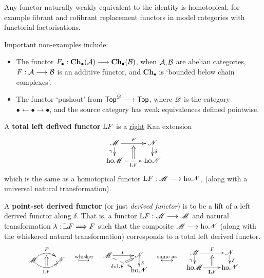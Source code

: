 \documentclass[11pt]{article}
\begin{document}
\begin{3. Derived functors via deformations}
\begin{itemise}
\item Any functor naturally weakly equivalent to the identity is homotopical, for example fibrant and cofibrant replacement functors in model categories with functorial factorisations.
\item Important non-examples include:\begin{itemize}\squishlist
\setlength{\parindent}{.25in}
\item The functor $F_\bullet:\textbf{Ch}_\bullet(\mathcal{A})\longrightarrow \textbf{Ch}_\bullet(\mathcal{B})$, when $\mathcal{A},\mathcal{B}$ are abelian categories, $F:\mathcal{A}\longrightarrow\mathcal{B}$ is an additive functor, and $\textbf{Ch}_\bullet$ is `bounded below chain complexes'.
\item The functor `pushout' from $\mathsf{Top}^{\mathscr{D}}\longrightarrow\mathsf{Top}$, where $\mathscr{D}$ is the category $\bullet \leftarrow\bullet \rightarrow\bullet$, and the source category has weak equivalences defined pointwise.
\end{itemize}
\item A \textbf{total left defived functor} $\textup{L}F$ is a \underline{right} Kan extension
\[\xymatrix@R=4mm{
\scrM
\ar[r]^-{F}_{}="t"
\ar[d]_-{\gamma}
&%
\scrN
\ar[d]^-{\delta}
\\%
\ho\scrM
\ar@{-->}[r]_-{\textup{L}F}^{}="b"
&%
\ho\scrN%
\ar@{=>}"b";"t"
}\]
which is the same as a homotopical functor $\textup{L}F:\mathscr{M}\longrightarrow\textup{ho}\mathscr{N}$, (along with a universal natural transformation).
\item A \textbf{point-set derived functor} (or just \emph{derived functor}) is to be a lift of a left derived functor along $\delta$. That is, a functor $\mathbb{L}F:\mathscr{M}\longrightarrow\mathscr{M}$ and natural transformation $\lambda:\mathbb{L}F\Longrightarrow F$ such that the composite $\mathscr{M}\longrightarrow\textup{ho}\mathscr{N}$ (along with the whiskered natural transformation) corresponds to a total left derived functor.
\[
\vcenter{\xymatrix@1{
\scrM
\ar@/^1em/[r]^-{F}_{}="1"
\ar@/_1em/[r]_-{\mathbb{L}F}^{}="2"
&%
\scrN
\ar@{=>}"2";"1"
}}
\quad \overset{\textup{whisker}}{\mapsto}\quad 
\vcenter{\xymatrix@1@R=4mm{
\scrM
\ar[r]^-{F}_{}="t"
\ar@{-->}[dr]_-{\delta\circ\mathbb{L}F}^{}="b"
&%
\scrN
\ar[d]^\delta
\\%
&%
\ho\scrN%
\ar@{=>}"b";[u]
}}
\quad \overset{\textup{same as}}{\longleftrightarrow}\quad 
\vcenter{\xymatrix@1@R=4mm{
\scrM
\ar[r]^-{F}_{}="t"
\ar[d]_\gamma
&%
\scrN
\ar[d]^\delta
\\%
\ho\scrM
\ar@{->}[r]_-{\textbf{L}F}^{}="b"
&%
\ho\scrN%
\ar@{=>}"b";"t"
}}\]
\end{itemise}

\end{3. Derived functors via deformations}
\end{document}
